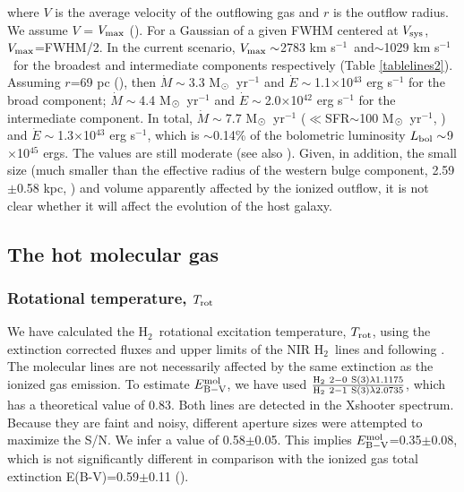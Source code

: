 \documentclass{aa}
\newcommand{\kms}{km s$^{-1}$~}
\newcommand{\hmol}{H$_2$~}
\newcommand{\msun}{M$_{\rm \odot}$~}
\newcommand{\ergs}{erg s$^{-1}$}
\begin{document}
where  $V$ is the average velocity of the outflowing gas and $r$ is the outflow radius. We assume $V$ = $V_{\rm max}$ (\citealt{Rupke2005b}).  For a Gaussian of a given FWHM centered at $V_{\rm sys}$, $V_{\rm max}$=FWHM/2. In the current scenario,   $V_{\rm max}\sim$2783 \kms and$\sim$1029 \kms  for the broadest and intermediate components respectively  (Table \ref{tablelines2}). Assuming $r$=69 pc (\citealt{Tadhunter2018}),  then $\dot{M}\sim$3.3 \msun yr$^{-1}$  and  $\dot{E}\sim$1.1$\times$10$^{43}$ erg s$^{-1}$ for the broad component; $\dot{M}\sim$4.4 \msun yr$^{-1}$  and  $\dot{E}\sim$2.0$\times$10$^{42}$ erg s$^{-1}$ for the intermediate component. In total, $\dot{M}\sim$7.7 \msun yr$^{-1}$  ($\ll$SFR$\sim$100 \msun yr$^{-1}$, \citealt{Rupke2005a}) and  $\dot{E}\sim$1.3$\times$10$^{43}$ \ergs, which is $\sim$0.14\% of the bolometric luminosity $L_{\rm bol}\sim$9$\times$10$^{45}$ ergs. The values are still moderate  (see also \citealt{Holt2011,Rose2018}).  Given, in addition, the small size  (much smaller than the effective radius of the western bulge component, 2.59$\pm$0.58 kpc, \citealt{Dasyra2006}) and volume apparently affected by the ionized outflow,  it is not clear whether  it will affect the evolution of the host galaxy.  



\subsection{The hot molecular gas}
\label{sec-mol}


\subsubsection{Rotational temperature, $T_{\rm rot}$}
\label{tempmol}

We have calculated the \hmol rotational excitation temperature, $T_{\rm rot}$, using  the extinction corrected fluxes and upper limits of the   NIR \hmol lines and following  \cite{Pereira2014}.  The molecular lines
 are not necessarily affected by the same extinction as the ionized gas emission.  To estimate $E_{\rm B-V}^{\rm mol}$, we have used $\frac{\rm H_2~ 2-0~ S(3) \lambda 1.1175}{\rm H_2 ~2-1~ S(3)\lambda 2.0735}$, which  has a theoretical  value of 0.83. Both lines are detected in the Xshooter spectrum. Because they are faint and noisy, different aperture sizes were attempted to maximize the S/N.  We infer a value of 0.58$\pm$0.05. This implies $E_{\rm B-V}^{\rm mol}$=0.35$\pm$0.08, which is not significantly different in comparison with  the ionized gas total extinction E(B-V)=0.59$\pm$0.11 (\citealt{Holt2003,Rose2018}). 
\end{document}
